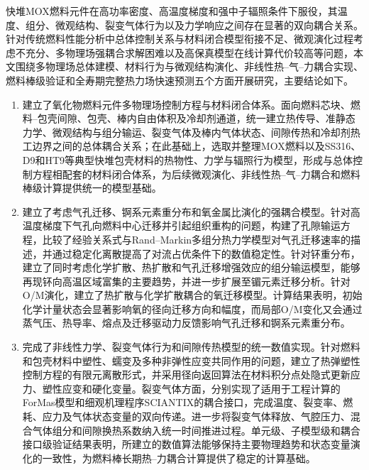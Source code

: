 
\label{chap:conclusions_outlook}


快堆MOX燃料元件在高功率密度、高温度梯度和强中子辐照条件下服役，其温度、组分、微观结构、裂变气体行为以及力学响应之间存在显著的双向耦合关系。针对传统燃料性能分析中总体控制关系与材料闭合模型衔接不足、微观演化过程考虑不充分、多物理场强耦合求解困难以及高保真模型在线计算代价较高等问题，本文围绕多物理场总体建模、材料行为与微观结构演化、非线性热--气--力耦合实现、燃料棒级验证和全寿期完整热力场快速预测五个方面开展研究，主要结论如下。

\begin{enumerate}[label={（\arabic*）},leftmargin=2.8em]
	\item 建立了氧化物燃料元件多物理场控制方程与材料闭合体系。面向燃料芯块、燃料--包壳间隙、包壳、棒内自由体积及冷却剂通道，统一建立热传导、准静态力学、微观结构与组分输运、裂变气体及棒内气体状态、间隙传热和冷却剂热工边界之间的总体耦合关系；在此基础上，选取并整理MOX燃料以及SS316、D9和HT9等典型快堆包壳材料的热物性、力学与辐照行为模型，形成与总体控制方程相配套的材料闭合体系，为后续微观演化、非线性热--气--力耦合和燃料棒级计算提供统一的模型基础。
	
	\item 建立了考虑气孔迁移、锕系元素重分布和氧金属比演化的强耦合模型。针对高温度梯度下气孔向燃料中心迁移并引起组织重构的问题，构建了孔隙输运方程，比较了经验关系式与Rand--Markin多组分热力学模型对气孔迁移速率的描述，并通过稳定化离散提高了对流占优条件下的数值稳定性。针对钚重分布，建立了同时考虑化学扩散、热扩散和气孔迁移增强效应的组分输运模型，能够再现钚向高温区域富集的主要趋势，并进一步扩展至镅元素迁移分析。针对O/M演化，建立了热扩散与化学扩散耦合的氧迁移模型。计算结果表明，初始化学计量状态会显著影响氧的径向迁移方向和幅度，而局部O/M变化又会通过蒸气压、热导率、熔点及迁移驱动力反馈影响气孔迁移和锕系元素重分布。
	
	\item 完成了非线性力学、裂变气体行为和间隙传热模型的统一数值实现。针对燃料和包壳材料中塑性、蠕变及多种非弹性应变共同作用的问题，建立了热弹塑性控制方程的有限元离散形式，并采用径向返回算法在材料积分点处隐式更新应力、塑性应变和硬化变量。裂变气体方面，分别实现了适用于工程计算的ForMas模型和细观机理程序SCIANTIX的耦合接口，完成温度、裂变率、燃耗、应力及气体状态变量的双向传递。进一步将裂变气体释放、气腔压力、混合气体组分和间隙换热系数纳入统一时间推进过程。单元级、子模型级和耦合接口级验证结果表明，所建立的数值算法能够保持主要物理趋势和状态变量演化的一致性，为燃料棒长期热--力耦合计算提供了稳定的计算基础。
	

\end{enumerate}
